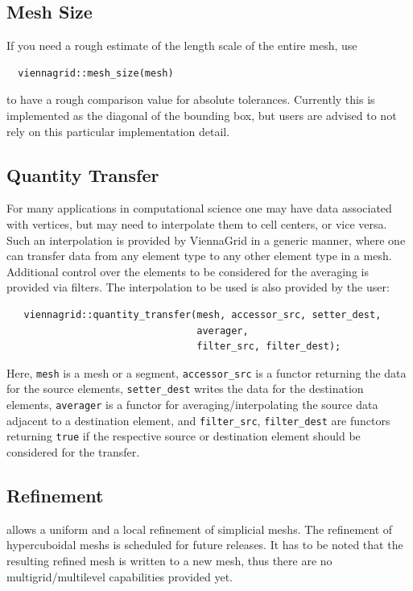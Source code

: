 
  \subsection{Mesh Size}
  If you need a rough estimate of the length scale of the entire mesh, use
 \begin{lstlisting}
  viennagrid::mesh_size(mesh)
 \end{lstlisting}
  to have a rough comparison value for absolute tolerances.
  Currently this is implemented as the diagonal of the bounding box, but users are advised to not rely on this particular implementation detail.

  \subsection{Quantity Transfer}
  For many applications in computational science one may have data associated with vertices, but may need to interpolate them to cell centers, or vice versa.
  Such an interpolation is provided by ViennaGrid in a generic manner, where one can transfer data from any element type to any other element type in a mesh.
  Additional control over the elements to be considered for the averaging is provided via filters.
  The interpolation to be used is also provided by the user:
  \begin{lstlisting}
   viennagrid::quantity_transfer(mesh, accessor_src, setter_dest,
                                 averager,
                                 filter_src, filter_dest);
  \end{lstlisting}
  Here, \lstinline|mesh| is a mesh or a segment, \lstinline|accessor_src| is a functor returning the data for the source elements, \lstinline|setter_dest| writes the data for the destination elements,
  \lstinline|averager| is a functor for averaging/interpolating the source data adjacent to a destination element, and \lstinline|filter_src|, \lstinline|filter_dest| are functors returning \lstinline|true|
  if the respective source or destination element should be considered for the transfer.


 \subsection{Refinement}
 {\ViennaGridversion} allows a uniform and a local refinement of simplicial meshs. The refinement of hypercuboidal meshs is scheduled for future releases.
It has to be noted that the resulting refined mesh is written to a new mesh, thus there are no multigrid/multilevel capabilities provided yet.

